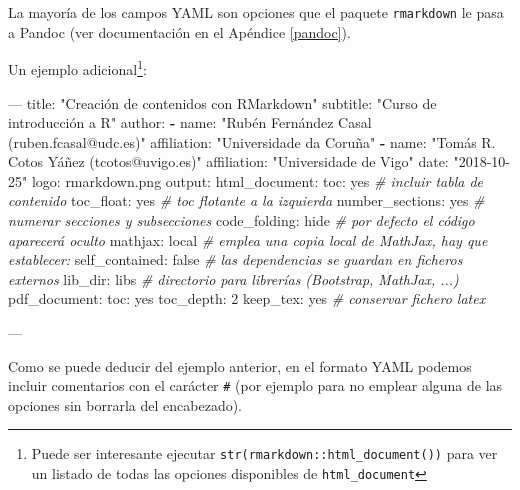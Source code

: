 \documentclass[]{book}
\newenvironment{Shaded}{\begin{snugshade}}{\end{snugshade}}
\newcommand{\KeywordTok}[1]{\textcolor[rgb]{0.13,0.29,0.53}{\textbf{#1}}}
\newcommand{\StringTok}[1]{\textcolor[rgb]{0.31,0.60,0.02}{#1}}
\newcommand{\CommentTok}[1]{\textcolor[rgb]{0.56,0.35,0.01}{\textit{#1}}}
\newcommand{\OtherTok}[1]{\textcolor[rgb]{0.56,0.35,0.01}{#1}}
\newcommand{\FunctionTok}[1]{\textcolor[rgb]{0.00,0.00,0.00}{#1}}
\newcommand{\AttributeTok}[1]{\textcolor[rgb]{0.77,0.63,0.00}{#1}}
\let\rmarkdownfootnote\footnote%
\def\footnote{\protect\rmarkdownfootnote}
\theoremstyle{definition}
\theoremstyle{definition}
\theoremstyle{definition}
\theoremstyle{remark}
\begin{document}
La mayoría de los campos YAML son opciones que el paquete
\texttt{rmarkdown} le pasa a Pandoc (ver documentación en el Apéndice
\ref{pandoc}).

Un ejemplo adicional\footnote{Puede ser interesante ejecutar
  \texttt{str(rmarkdown::html\_document())} para ver un listado de todas
  las opciones disponibles de \texttt{html\_document}}:

\begin{Shaded}
\begin{Highlighting}[]
\OtherTok{---}
\FunctionTok{title:}\AttributeTok{ }\StringTok{"Creación de contenidos con RMarkdown"}
\FunctionTok{subtitle:}\AttributeTok{ }\StringTok{"Curso de introducción a R"}
\FunctionTok{author:}
\KeywordTok{-} \FunctionTok{name:}\AttributeTok{ }\StringTok{"Rubén Fernández Casal (ruben.fcasal@udc.es)"}
  \FunctionTok{affiliation:}\AttributeTok{ }\StringTok{"Universidade da Coruña"}
\KeywordTok{-} \FunctionTok{name:}\AttributeTok{ }\StringTok{"Tomás R. Cotos Yáñez (tcotos@uvigo.es)"}
  \FunctionTok{affiliation:}\AttributeTok{ }\StringTok{"Universidade de Vigo"}
\FunctionTok{date:}\AttributeTok{ }\StringTok{"2018-10-25"}
\FunctionTok{logo:}\AttributeTok{ rmarkdown.png}
\FunctionTok{output:}
  \FunctionTok{html_document:}
    \FunctionTok{toc:}\AttributeTok{ yes                  }\CommentTok{# incluir tabla de contenido}
    \FunctionTok{toc_float:}\AttributeTok{ yes            }\CommentTok{# toc flotante a la izquierda}
    \FunctionTok{number_sections:}\AttributeTok{ yes      }\CommentTok{# numerar secciones y subsecciones}
    \FunctionTok{code_folding:}\AttributeTok{ hide        }\CommentTok{# por defecto el código aparecerá oculto}
    \FunctionTok{mathjax:}\AttributeTok{ local            }\CommentTok{# emplea una copia local de MathJax, hay que establecer:}
    \FunctionTok{self_contained:}\AttributeTok{ false     }\CommentTok{# las dependencias se guardan en ficheros externos}
    \FunctionTok{lib_dir:}\AttributeTok{ libs             }\CommentTok{# directorio para librerías (Bootstrap, MathJax, ...)}
  \FunctionTok{pdf_document:}
    \FunctionTok{toc:}\AttributeTok{ yes}
    \FunctionTok{toc_depth:}\AttributeTok{ 2}
    \FunctionTok{keep_tex:}\AttributeTok{ yes             }\CommentTok{# conservar fichero latex}
    
\OtherTok{---}
\end{Highlighting}
\end{Shaded}

Como se puede deducir del ejemplo anterior, en el formato YAML podemos
incluir comentarios con el carácter \texttt{\#} (por ejemplo para no
emplear alguna de las opciones sin borrarla del encabezado).
\end{document}
